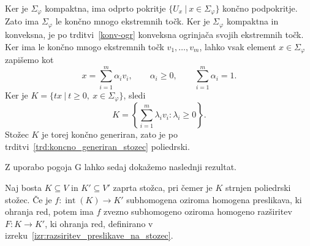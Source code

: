 \documentclass[mat2, tisk]{fmfdelo}
\begin{document}
\begin{dokaz}
Ker je $\Sigma_\varphi$ kompaktna, ima odprto pokritje
$\{U_x~|~x\in\Sigma_\varphi\}$ končno podpokritje.
Zato ima $\Sigma_\varphi$ le končno mnogo ekstremnih točk.
Ker je $\Sigma_\varphi$ kompaktna in konveksna,
je po trditvi~\ref{konv-ogr} konveksna ogrinjača
svojih ekstremnih točk. Ker ima le končno mnogo
ekstremnih točk $v_1,\ldots,v_m$, lahko vsak element
$x\in\Sigma_\varphi$ zapišemo kot
\[
x=\sum_{i=1}^{m}\alpha_i v_i,
\qquad
\alpha_i\geq0,
\qquad
\sum_{i=1}^{m}\alpha_i=1.
\]
Ker je
$K=\{tx ~|~ t\geq0,\ x\in\Sigma_\varphi\}$,
sledi
\[
K=\left\{
\sum_{i=1}^{m}\lambda_i v_i:
\lambda_i\geq0
\right\}.
\]
Stožec $K$ je torej končno generiran, zato je
po trditvi~\ref{trd:koncno_generiran_stozec}
poliedrski.
\end{dokaz}

Z uporabo pogoja G lahko sedaj dokažemo naslednji rezultat.

\begin{izrek}\label{izr:zvezna_razsiritev_poliedrski_stozec}
Naj bosta $K\subseteq V$ in $K'\subseteq V'$ zaprta stožca, pri
čemer je $K$ strnjen poliedrski stožec. Če je
$f\colon\operatorname{int}(K)\longrightarrow K'$ subhomogena oziroma
homogena preslikava, ki ohranja red, potem ima $f$ zvezno
subhomogeno oziroma homogeno razširitev
$F\colon K\longrightarrow K'$, ki ohranja red, definirano v izreku~\ref{izr:razsiritev_preslikave_na_stozec}.
\end{izrek}
\end{document}
